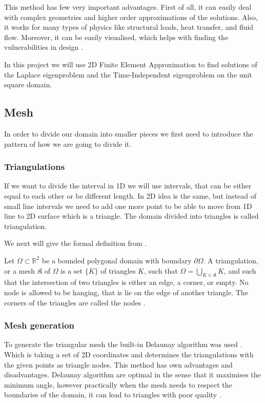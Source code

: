 \documentclass[conference]{IEEEtran}
\begin{document}
This method has few very important advantages. First of all, it can easily deal with complex geometries and higher order approximations of the solutions. Also, it works for many types of physics like structural loads, heat transfer, and fluid flow. Moreover, it can be easily visualised, which helps with finding the vulnerabilities in design \cite{b11}.

In this project we will use 2D Finite Element Approximation to find solutions of the Laplace eigenproblem and the Time-Independent  eigenproblem on the unit square domain.


\subsection{Mesh}
In order to divide our domain into smaller pieces we first need to introduce the pattern of how we are going to divide it.


\subsubsection{Triangulations} 
If we want to divide the interval in 1D we will use intervals, that can be either equal to each other or be different length. 
In 2D idea is the same, but instead of small line intervals we need to add one more point to be able to move from 1D line to 2D surface which is a triangle. The domain divided into triangles is called triangulation.

We next will give the formal definition from \cite{b10}.

Let $\Omega \subset \mathbb{R}^2$ be a bounded polygonal domain with boundary $\partial\Omega$. A triangulation, or a mesh $\mathfrak{K}$ of $\Omega$ is a set $\{K\}$ of triangles $K$, such that $\Omega = \bigcup_{K \in \mathfrak{K}}K$, and such that the intersection of two triangles is either an edge, a corner, or empty. 
No node is allowed to be hanging, that is lie on the edge of another triangle. The corners of the triangles are called the nodes \cite{b10}.


\subsubsection{Mesh generation}
To generate the triangular mesh the built-in Delaunay algorithm was used \cite{b12}. Which is taking a set of 2D coordinates and determines the triangulations with the given points as triangle nodes. 
This method has own advantages and disadvantages. Delaunay algorithm are optimal in the sense that it maximises the minimum angle, however practically when the mesh needs to respect the boundaries of the domain, it can lead to triangles with poor quality \cite{b10}.
\end{document}
